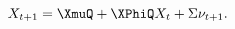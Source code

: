 \begin{equation} \label{eq:nXvarsQ}
	\XvarsFwd = \XmuQ + \XPhiQ \Xvars  + \XSigma \error.
\end{equation}